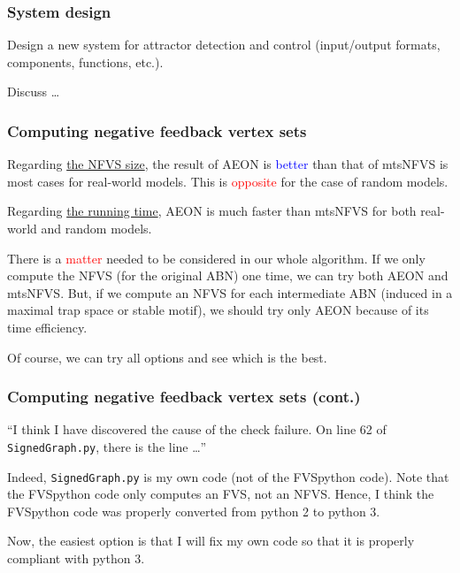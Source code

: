 \documentclass{beamer}              %
\newcommand{\blue}[1]{\textcolor{blue}{#1}}
\newcommand{\red}[1]{\textcolor{red}{#1}}
\begin{document}
\begin{frame}
\frametitle{System design}

Design a new system for attractor detection and control (input/output formats, components, functions, etc.).

\hspace{0.8cm}

Discuss \dots

\end{frame}

\begin{frame}
\frametitle{Computing negative feedback vertex sets}

Regarding \underline{the NFVS size}, the result of AEON is \blue{better} than that of mtsNFVS is most cases for real-world models. This is \red{opposite} for the case of random models.

\hspace{0.8cm}

Regarding \underline{the running time}, AEON is much faster than mtsNFVS for both real-world and random models.

\hspace{0.8cm}

There is a \red{matter} needed to be considered in our whole algorithm. If we only compute the NFVS (for the original ABN) one time, we can try both AEON and mtsNFVS. But, if we compute an NFVS for each intermediate ABN (induced in a maximal trap space or stable motif), we should try only AEON because of its time efficiency.

\hspace{0.8cm}

Of course, we can try all options and see which is the best. 

\end{frame}

\begin{frame}
\frametitle{Computing negative feedback vertex sets (cont.)}

``I think I have discovered the cause of the check failure. On line 62 of \texttt{SignedGraph.py}, there is the line \dots''

\hspace{0.8cm}

Indeed, \texttt{SignedGraph.py} is my own code (not of the FVSpython code).
Note that the FVSpython code only computes an FVS, not an NFVS.
Hence, I think the FVSpython code was properly converted from python 2 to python 3.

\hspace{0.8cm}

Now, the easiest option is that I will fix my own code so that it is properly compliant with python 3.

\end{frame}
\end{document}
